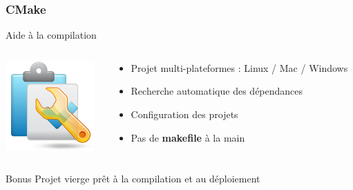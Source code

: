 \documentclass{beamer}
\begin{document}
\begin{frame}[label=cmake]
  \frametitle{CMake}
  
    \begin{block}{Aide à la compilation}
    \begin{columns}
      \begin{column}{0.2\linewidth}
        \includegraphics[width=1\linewidth]{images/compiler.png}
      \end{column}
      \hspace{-15mm}
      \begin{column}{0.7\linewidth}
        \begin{itemize}
        \item Projet multi-plateformes :\linebreak
        Linux / Mac / Windows
        \item Recherche automatique des dépendances
        \item Configuration des projets
        \item Pas de \textbf{makefile} à la main
        \end{itemize}
      \end{column}
      \end{columns}
	\end{block}

    \begin{exampleblock}{Bonus}
    Projet vierge prêt à la compilation et au déploiement
    \end{exampleblock}
\end{frame}
\end{document}

